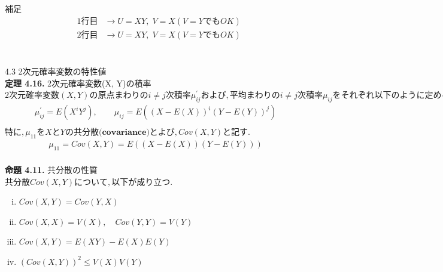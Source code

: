 \documentclass[dvipdfmx,10pt, a4j]{jarticle}
\theoremstyle{definition}
\begin{document}
\begin{itembox}[l]{補足}
    \begin{align*}
        &1行目 &\to U=XY,\; V=X (V=YでもOK)\\
        &2行目 &\to U=XY,\; V=X (V=YでもOK)\\
    \end{align*}
\end{itembox}\\

\noindent
{\LARGE 4.3 2次元確率変数の特性値}\\

\noindent
\textbf{定理 4.16.} 2次元確率変数(X, Y)の積率\\
$2次元確率変数(X, Y)の原点まわりの i \neq j 次積率 \mu_{ij}^{\prime}および, 平均まわりのi \neq j 次積率\mu_{ij}をそれぞれ以下のように定める.$\\
\begin{align*}
    \mu_{ij}^{\prime} = E(X^{i}Y^{j}), \qquad \mu_{ij} = E((X - E(X))^{i}(Y - E(Y))^{j})\\
\end{align*}
$特に, \mu_{11} を X と Y の \textbf{共分散(covariance)}とよび, Cov(X, Y)と記す.$\\
\begin{align*}
    \mu_11 = Cov(X, Y) = E((X-E(X))(Y-E(Y)))\\
\end{align*}

\noindent
\textbf{命題 4.11.} 共分散の性質\\
$共分散Cov(X, Y)について, 以下が成り立つ.$\\
\begin{enumerate}[i)]
    \item $Cov(X, Y) = Cov(Y, X)$\\
    \item $Cov(X, X) = V(X),\quad Cov(Y, Y) = V(Y)$\\
    \item $Cov(X, Y) = E(XY) - E(X)E(Y)$\\
    \item $(Cov(X, Y))^2 \leq V(X)V(Y)$\\
\end{enumerate}
\end{document}
